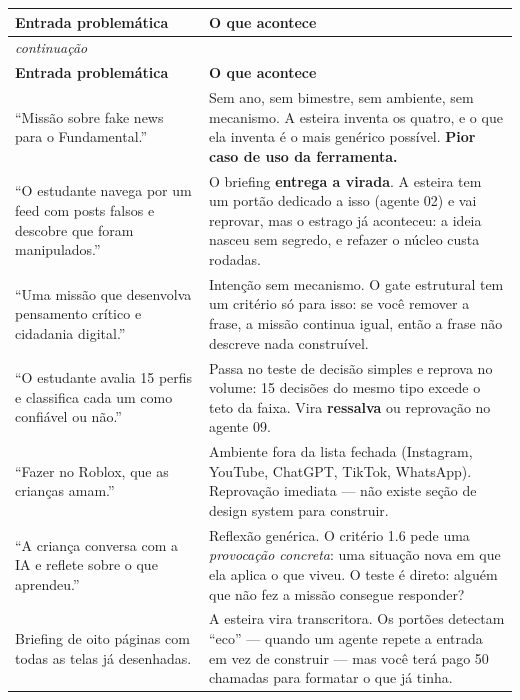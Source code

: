 \documentclass[11pt,a4paper]{article}
\newcommand{\Ambar}[1]{\textcolor{ambar}{\textbf{#1}}}
\newcommand{\Vermelho}[1]{\textcolor{vermelho}{\textbf{#1}}}
\begin{document}
\begin{center}
\begin{longtable}{p{7.1cm}p{7.9cm}}
\toprule
\textbf{Entrada problemática} & \textbf{O que acontece} \\
\midrule
\endfirsthead
\multicolumn{2}{l}{\small\itshape continuação} \\
\toprule
\textbf{Entrada problemática} & \textbf{O que acontece} \\
\midrule
\endhead
``Missão sobre fake news para o Fundamental.'' &
Sem ano, sem bimestre, sem ambiente, sem mecanismo. A esteira inventa os quatro, e o que ela
inventa é o mais genérico possível. \Vermelho{Pior caso de uso da ferramenta.} \\
\addlinespace
``O estudante navega por um feed com posts falsos e descobre que foram manipulados.'' &
O briefing \textbf{entrega a virada}. A esteira tem um portão dedicado a isso (agente 02) e vai
reprovar, mas o estrago já aconteceu: a ideia nasceu sem segredo, e refazer o núcleo custa rodadas. \\
\addlinespace
``Uma missão que desenvolva pensamento crítico e cidadania digital.'' &
Intenção sem mecanismo. O gate estrutural tem um critério só para isso: se você remover a
frase, a missão continua igual, então a frase não descreve nada construível. \\
\addlinespace
``O estudante avalia 15 perfis e classifica cada um como confiável ou não.'' &
Passa no teste de decisão simples e reprova no volume: 15 decisões do mesmo tipo excede o teto
da faixa. Vira \Ambar{ressalva} ou reprovação no agente 09. \\
\addlinespace
``Fazer no Roblox, que as crianças amam.'' &
Ambiente fora da lista fechada (Instagram, YouTube, ChatGPT, TikTok, WhatsApp). Reprovação
imediata --- não existe seção de design system para construir. \\
\addlinespace
``A criança conversa com a IA e reflete sobre o que aprendeu.'' &
Reflexão genérica. O critério 1.6 pede uma \emph{provocação concreta}: uma situação nova em que
ela aplica o que viveu. O teste é direto: alguém que não fez a missão consegue responder? \\
\addlinespace
Briefing de oito páginas com todas as telas já desenhadas. &
A esteira vira transcritora. Os portões detectam ``eco'' --- quando um agente repete a entrada
em vez de construir --- mas você terá pago 50 chamadas para formatar o que já tinha. \\
\bottomrule
\end{longtable}
\end{center}
\end{document}
